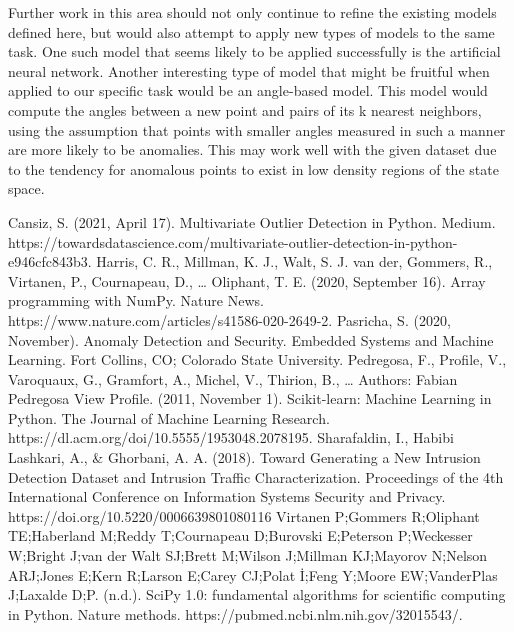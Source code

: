 \documentclass[conference]{IEEEtran}
\begin{document}
Further work in this area should not only continue to refine the existing models defined here, but would also attempt to apply new types of models to the same task. One such model that seems likely to be applied successfully is the artificial neural network. Another interesting type of model that might be fruitful when applied to our specific task would be an angle-based model. This model would compute the angles between a new point and pairs of its k nearest neighbors, using the assumption that points with smaller angles measured in such a manner are more likely to be anomalies. This may work well with the given dataset due to the tendency for anomalous points to exist in low density regions of the state space.


%

\begin{thebibliography}{00}
 Cansiz, S. (2021, April 17). Multivariate Outlier Detection in Python. Medium. https://towardsdatascience.com/multivariate-outlier-detection-in-python-e946cfc843b3. 
 Harris, C. R., Millman, K. J., Walt, S. J. van der, Gommers, R., Virtanen, P., Cournapeau, D., … Oliphant, T. E. (2020, September 16). Array programming with NumPy. Nature News. https://www.nature.com/articles/s41586-020-2649-2. 
 Pasricha, S. (2020, November). Anomaly Detection and Security. Embedded Systems and Machine Learning. Fort Collins, CO; Colorado State University. 
 Pedregosa, F., Profile, V., Varoquaux, G., Gramfort, A., Michel, V., Thirion, B., … Authors:   Fabian Pedregosa  View Profile. (2011, November 1). Scikit-learn: Machine Learning in Python. The Journal of Machine Learning Research. https://dl.acm.org/doi/10.5555/1953048.2078195. 
Sharafaldin, I., Habibi Lashkari, A., \& Ghorbani, A. A. (2018). Toward Generating a New Intrusion Detection Dataset and Intrusion Traffic Characterization. Proceedings of the 4th International Conference on Information Systems Security and Privacy. https://doi.org/10.5220/0006639801080116 
Virtanen P;Gommers R;Oliphant TE;Haberland M;Reddy T;Cournapeau D;Burovski E;Peterson P;Weckesser W;Bright J;van der Walt SJ;Brett M;Wilson J;Millman KJ;Mayorov N;Nelson ARJ;Jones E;Kern R;Larson E;Carey CJ;Polat İ;Feng Y;Moore EW;VanderPlas J;Laxalde D;P. (n.d.). SciPy 1.0: fundamental algorithms for scientific computing in Python. Nature methods. https://pubmed.ncbi.nlm.nih.gov/32015543/. 
\end{thebibliography}
\end{document}
